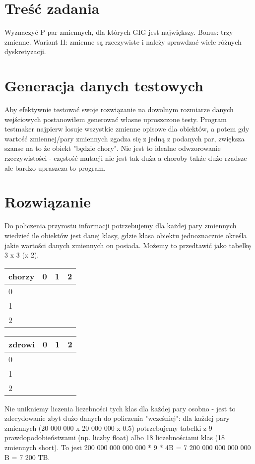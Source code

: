 \documentclass[a4paper]{article}
\begin{document}
    \section{Treść zadania}
    Wyznaczyć P par zmiennych, dla których GIG jest największy. Bonus: trzy zmienne. Wariant II: zmienne są rzeczywiste i należy sprawdzać wiele różnych dyskretyzacji.
    \section{Generacja danych testowych}
    Aby efektywnie testować swoje rozwiązanie na dowolnym rozmiarze danych wejściowych postanowiłem generować własne uproszczone testy. Program testmaker najpierw losuje wszystkie zmienne opisowe dla obiektów, a potem gdy wartość zmiennej/pary zmiennych zgadza się z jedną z podanych par, zwiększa szanse na to że obiekt "będzie chory". Nie jest to idealne odwzorowanie rzeczywistości - częstość mutacji nie jest tak duża a choroby także dużo rzadsze ale bardzo upraszcza to program.
    \section{Rozwiązanie}
    Do policzenia przyrostu informacji potrzebujemy dla każdej pary zmiennych wiedzieć ile obiektów jest danej klasy, gdzie klasa obiektu jednoznacznie określa jakie wartości danych zmiennych on posiada. Możemy to przedtawić jako tabelkę 3 x 3 (x 2).

    \begin{tabular}{|l|r|r|r|}
        \hline
        chorzy & 0 & 1 & 2 \\
        \hline
        0 & & & \\
        \hline
        1 & & & \\
        \hline
        2 & & & \\
        \hline
    \end{tabular}
    \begin{tabular}{|l|r|r|r|}
        \hline
        zdrowi & 0 & 1 & 2 \\
        \hline
        0 & & & \\
        \hline
        1 & & & \\
        \hline
        2 & & & \\
        \hline
    \end{tabular}

    Nie unikniemy liczenia liczebności tych klas dla każdej pary osobno - jest to zdecydowanie zbyt dużo danych do policzenia "wcześniej": dla każdej pary zmiennych (20 000 000 x 20 000 000 x 0.5) potrzebujemy tabelki z 9 prawdopodobieństwami (np. liczby float) albo 18 liczebnościami klas (18 zmiennych short). To jest 200 000 000 000 000 * 9 * 4B = 7 200 000 000 000 000 B = 7 200 TB.
\end{document}

